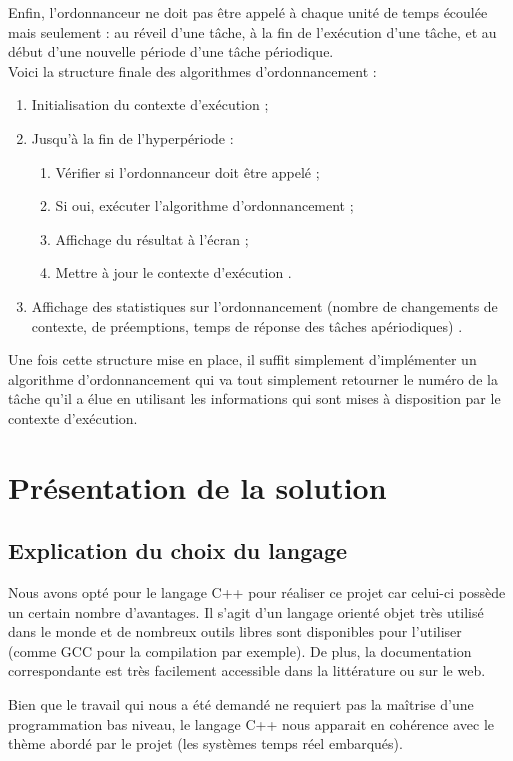 		Enfin, l'ordonnanceur ne doit pas être appelé à chaque unité de temps écoulée mais seulement : au réveil d'une tâche, à la fin de l'exécution d'une tâche, et au début d'une nouvelle période d'une tâche périodique.\\
		
		Voici la structure finale des algorithmes d'ordonnancement :
		\begin{enumerate}
			\item Initialisation du contexte d'exécution ;
			\item Jusqu'à la fin de l'hyperpériode :
			\begin{enumerate}
				\item Vérifier si l'ordonnanceur doit être appelé ;
				\item Si oui, exécuter l'algorithme d'ordonnancement ;
				\item Affichage du résultat à l'écran ;
				\item Mettre à jour le contexte d'exécution .
			\end{enumerate}
			\item Affichage des statistiques sur l'ordonnancement (nombre de changements de contexte, de préemptions, temps de réponse des tâches apériodiques) .
		\end{enumerate}
		
		Une fois cette structure mise en place, il suffit simplement d'implémenter un algorithme d'ordonnancement qui va tout simplement retourner le numéro de la tâche qu'il a élue en utilisant les informations qui sont mises à disposition par le contexte d'exécution.




\chapter{Présentation de la solution}
	\section{Explication du choix du langage}
		\label{sec:langage}
		Nous avons opté pour le langage C++ pour réaliser ce projet car celui-ci possède un certain nombre d'avantages. Il s'agit d'un langage orienté objet très utilisé dans le monde et de nombreux outils libres sont disponibles pour l'utiliser (comme GCC pour la compilation par exemple). De plus, la documentation correspondante est très facilement accessible dans la littérature ou sur le web.
	
		Bien que le travail qui nous a été demandé ne requiert pas la maîtrise d'une programmation bas niveau, le langage C++ nous apparait en cohérence avec le thème abordé par le projet (les systèmes temps réel embarqués).
		

